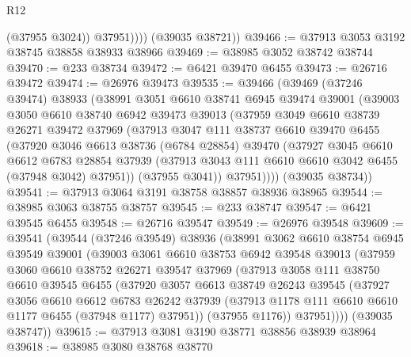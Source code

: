 \begin{lexlean}{R12}
\begin{coremodule}
                (@37955 @3024))
              @37951))))
      (@39035 @38721))
@39466 := @37913 @3053 @3192 @38745 @38858 @38933 @38966
@39469 := @38985 @3052 @38742 @38744
@39470 := @233 @38734
@39472 := @6421 @39470 @6455
@39473 := @26716 @39472
@39474 := @26976 @39473
@39535 := @39466
    (@39469
      (@37246 @39474)
      @38933
      (@38991
        @3051
        @6610
        @38741
        @6945
        @39474
        @39001
        (@39003
          @3050
          @6610
          @38740
          @6942
          @39473
          @39013
          (@37959
            @3049
            @6610
            @38739
            @26271
            @39472
            @37969
            (@37913
              @3047
              @111
              @38737
              @6610
              @39470
              @6455
              (@37920
                @3046
                @6613
                @38736
                (@6784 @28854)
                @39470
                (@37927
                  @3045
                  @6610
                  @6612
                  @6783
                  @28854
                  @37939
                  (@37913 @3043 @111 @6610 @6610 @3042 @6455 (@37948 @3042) @37951))
                (@37955 @3041))
              @37951))))
      (@39035 @38734))
@39541 := @37913 @3064 @3191 @38758 @38857 @38936 @38965
@39544 := @38985 @3063 @38755 @38757
@39545 := @233 @38747
@39547 := @6421 @39545 @6455
@39548 := @26716 @39547
@39549 := @26976 @39548
@39609 := @39541
    (@39544
      (@37246 @39549)
      @38936
      (@38991
        @3062
        @6610
        @38754
        @6945
        @39549
        @39001
        (@39003
          @3061
          @6610
          @38753
          @6942
          @39548
          @39013
          (@37959
            @3060
            @6610
            @38752
            @26271
            @39547
            @37969
            (@37913
              @3058
              @111
              @38750
              @6610
              @39545
              @6455
              (@37920
                @3057
                @6613
                @38749
                @26243
                @39545
                (@37927
                  @3056
                  @6610
                  @6612
                  @6783
                  @26242
                  @37939
                  (@37913 @1178 @111 @6610 @6610 @1177 @6455 (@37948 @1177) @37951))
                (@37955 @1176))
              @37951))))
      (@39035 @38747))
@39615 := @37913 @3081 @3190 @38771 @38856 @38939 @38964
@39618 := @38985 @3080 @38768 @38770

\end{coremodule}
\end{lexlean}
